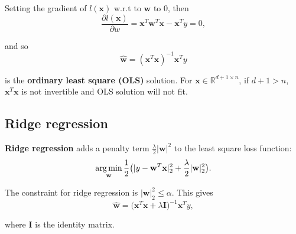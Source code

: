\documentclass[../main.tex]{subfiles}
\begin{document}
Setting the gradient of $l(\textbf{x})$ w.r.t to $\textbf{w}$ to 0, then
$$\frac{\partial l(\textbf{x})}{\partial w}=\textbf{x}^T\textbf{w}^T\textbf{x}-\textbf{x}^Ty=0,$$

and so $$\hat{\textbf{w}}=(\textbf{x}^T\textbf{x})^{-1}\textbf{x}^Ty$$ 

is the \textbf{ordinary least square (OLS)} solution. For $\textbf{x}\in \mathbb{R}^{d + 1 \times n}$, if $d + 1 > n$, $\textbf{x}^T\textbf{x}$ is not invertible and OLS solution will not fit.

\subsection{Ridge regression}
\textbf{Ridge regression} adds a penalty term $\frac{\lambda}{2}|\textbf{w}|^2$ to the least square loss function: $$\operatorname*{arg\,min}_{\textbf{w}}\frac{1}{2}\big(|y-\textbf{w}^T\textbf{x}|^2_2+\frac{\lambda}{2}|\textbf{w}|^2_2\big).$$ 

The constraint for ridge regression is $|\textbf{w}|^2_2 \leq \alpha$. This gives $$\hat{\textbf{w}}=\big(\textbf{x}^T\textbf{x}+\lambda\textbf{I}\big)^{-1}\textbf{x}^Ty,$$ 

where $\textbf{I}$ is the identity matrix.
\end{document}
